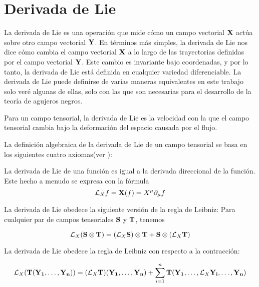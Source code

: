 \section{Derivada de Lie}
La derivada de Lie es una operación que mide cómo un campo vectorial $\mathbf{X}$ actúa sobre otro campo vectorial $\mathbf{Y}$. En términos más simples, la derivada de Lie nos dice cómo cambia el campo vectorial $\mathbf{X}$ a lo largo de las trayectorias definidas por el campo vectorial $\mathbf{Y}$. Este cambio es invariante bajo coordenadas, y por lo tanto, la derivada de Lie está definida en cualquier variedad diferenciable.
La derivada de Lie puede definirse de varias maneras equivalentes en este trabajo solo veré algunas de ellas, solo con las que son necesarias para el desarrollo de la teoría de agujeros negros.

Para un campo tensorial, la derivada de Lie es la velocidad con la que el campo tensorial cambia bajo la deformación del espacio causada por el flujo.

La definición algebraica de la derivada de Lie de un campo tensorial se basa en los siguientes cuatro axiomas(ver \cite{Lie}):

\begin{axiom}\label{ax:Lie1}
    La derivada de Lie de una función es igual a la derivada direccional de la función. Este hecho a menudo se expresa con la fórmula
    \begin{equation}
        \mathcal{L}_X f = \mathbf{X}(f) = X^\mu \partial_\mu f
    \end{equation}

\end{axiom}

\begin{axiom}\label{ax:Lie2}
    La derivada de Lie obedece la siguiente versión de la regla de Leibniz: Para cualquier par de campos tensoriales ${\mathbf{S}}$ y ${\mathbf{T}}$, tenemos

    \begin{equation}
        \mathcal{L}_X({\mathbf{S}} \otimes {\ensuremath{\mathbf{T}}}) = (\mathcal{L}_X {\mathbf{S}}) \otimes {\ensuremath{\mathbf{T}}} + {\mathbf{S}} \otimes (\mathcal{L}_X {\mathbf{T}})
    \end{equation}

\end{axiom}

\begin{axiom}\label{ax:Lie3}
    La derivada de Lie obedece la regla de Leibniz con respecto a la contracción:

    \begin{equation}
        \mathcal{L}_X({\mathbf{T}}({\mathbf{Y_1}}, \ldots, {\mathbf{Y_n}})) = (\mathcal{L}_X {\mathbf{T}})({\mathbf{Y_1}}, \ldots, {\mathbf{Y_n}}) + \sum_{i=1}^n {\mathbf{T}}({\mathbf{Y_1}}, \ldots, \mathcal{L}_X {\mathbf{Y_i}}, \ldots, {\mathbf{Y_n}})
    \end{equation}

\end{axiom}

